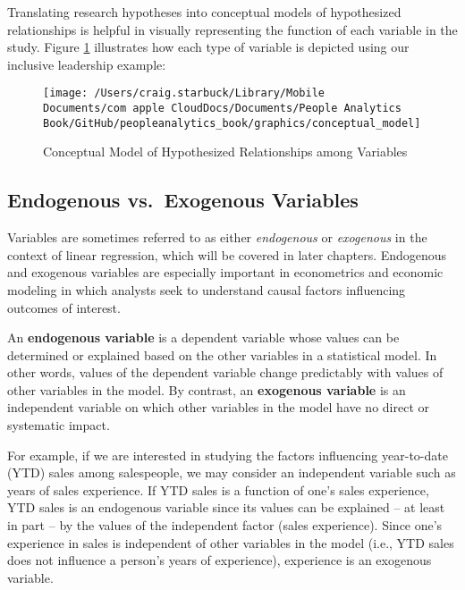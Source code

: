 \documentclass[
]{book}
\begin{document}
Translating research hypotheses into conceptual models of hypothesized relationships is helpful in visually representing the function of each variable in the study. Figure \ref{fig:concept-mdl} illustrates how each type of variable is depicted using our inclusive leadership example:

\begin{figure}

{\centering \texttt{[image: /Users/craig.starbuck/Library/Mobile Documents/com~apple~CloudDocs/Documents/People Analytics Book/GitHub/peopleanalytics\_book/graphics/conceptual\_model]} 

}

\caption{Conceptual Model of Hypothesized Relationships among Variables}\label{fig:concept-mdl}
\end{figure}

\hypertarget{endogenous-vs.-exogenous-variables}{%
\subsection{Endogenous vs.~Exogenous Variables}\label{endogenous-vs.-exogenous-variables}}

Variables are sometimes referred to as either \emph{endogenous} or \emph{exogenous} in the context of linear regression, which will be covered in later chapters. Endogenous and exogenous variables are especially important in econometrics and economic modeling in which analysts seek to understand causal factors influencing outcomes of interest.

An \textbf{endogenous variable} is a dependent variable whose values can be determined or explained based on the other variables in a statistical model. In other words, values of the dependent variable change predictably with values of other variables in the model. By contrast, an \textbf{exogenous variable} is an independent variable on which other variables in the model have no direct or systematic impact.

For example, if we are interested in studying the factors influencing year-to-date (YTD) sales among salespeople, we may consider an independent variable such as years of sales experience. If YTD sales is a function of one's sales experience, YTD sales is an endogenous variable since its values can be explained -- at least in part -- by the values of the independent factor (sales experience). Since one's experience in sales is independent of other variables in the model (i.e., YTD sales does not influence a person's years of experience), experience is an exogenous variable.
\end{document}
